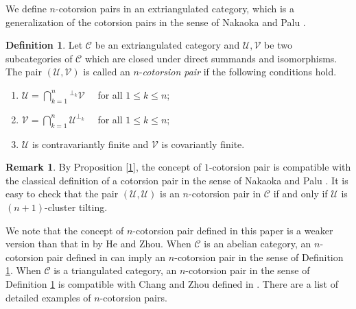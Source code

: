 \documentclass[a4paper,reqno,11pt]{amsart}
\theoremstyle{definition}
\newtheorem{definition}[theorem]{Definition}
\newtheorem{remark}[theorem]{Remark}
\def\C{\mathcal{C}}
\def\U{\mathcal{U}}
\def\V{\mathcal{V}}
\begin{document}
We define $n$-cotorsion pairs in  an extriangulated category, which is a generalization of the cotorsion pairs in the sense of Nakaoka and Palu \cite{NP}.
\begin{definition}\label{aaa}
Let $\C$ be an extriangulated category and $\U,\V$ be two subcategories of $\C$ which are closed
under direct summands and isomorphisms. The pair $(\U,\V)$ is called an $n$-\emph{cotorsion pair} if the following conditions hold.
\begin{enumerate}
  \item [(1)] $\U=\bigcap\limits_{k=1}^{n}{^{\perp_k}}\V$~~ for all $1\leq k\leq n$;
  \item [(2)] $\V=\bigcap\limits_{k=1}^{n}\U^{\perp_k}$~~ for all $1\leq k\leq n$;
   \item [(3)] $\U$ is contravariantly finite and $\V$ is covariantly finite.
\end{enumerate}
\end{definition}

\begin{remark}
By Proposition \ref{1}, the concept of $1$-cotorsion pair is compatible with the classical definition of a cotorsion pair in the sense of Nakaoka and Palu \cite{NP}. It is easy to check that the pair $(\U,\U)$ is an $n$-cotorsion pair in $\C$ if and only if $\U$ is $(n+1)$-cluster tilting.
\end{remark}
We note that the concept of $n$-cotorsion pair defined in this paper is a  weaker version than that in \cite{HZ} by He and Zhou. When $\C$ is an abelian category, an $n$-cotorsion pair defined in \cite{HMP} can imply an $n$-cotorsion pair in the sense of Definition \ref{aaa}. When $\C$ is a triangulated category, an $n$-cotorsion pair in the sense of Definition \ref{aaa} is compatible with Chang and Zhou defined in \cite{CZ}. There are a list of detailed examples of $n$-cotorsion pairs.
\end{document}
